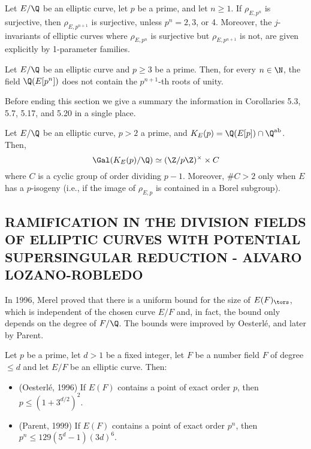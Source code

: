 \begin{thm} %
Let $E/\Q$ be an elliptic curve, let $p$ be a prime, and let $n \geq 1$. If $\rho_{E,p^n}$ is surjective, then $\rho_{E,p^{n+1}}$ is surjective, unless $p^n= 2,3$, or 4. Moreover, the $j$-invariants of elliptic curves where $\rho_{E,p^n}$ is surjective but $\rho_{E,p^{n+1}}$ is not, are given explicitly by 1-parameter families. 
\end{thm}


\begin{prop} %
Let $E/\Q$ be an elliptic curve and $p \geq 3$ be a prime. Then, for every $n \in \N$, the field $\Q(E[p^n])$ does not contain the $p^{n+1}$-th roots of unity. 
\end{prop}


Before ending this section we give a summary the information in Corollaries 5.3, 5.7, 5.17, and 5.20 in a single place.


\begin{prop}
Let $E/\Q$ be an elliptic curve, $p > 2$ a prime, and $K_E(p)= \Q(E[p]) \cap \Q^{\text{ab}}$. Then,
	\[
	\Gal(K_E(p)/\Q) \simeq (\Z/p\Z)^\times \times C
	\]
where $C$ is a cyclic group of order dividing $p - 1$. Moreover, $\#C > 2$ only when $E$ has a $p$-isogeny (i.e., if the image of $\rho_{E,p}$ is contained in a Borel subgroup). 
\end{prop}




\subsection{RAMIFICATION IN THE DIVISION FIELDS OF ELLIPTIC CURVES WITH POTENTIAL SUPERSINGULAR REDUCTION - ALVARO LOZANO-ROBLEDO}

In 1996, Merel proved that there is a uniform bound for the size of $E(F)_\tors$, which is independent of the chosen curve $E/F$ and, in fact, the bound only depends on the degree of $F/\Q$. The bounds were improved by Oesterl\'e, and later by Parent.


\begin{thm} %
Let $p$ be a prime, let $d > 1$ be a fixed integer, let $F$ be a number field $F$ of degree $\leq d$ and let $E/F$ be an elliptic curve. Then:
	\begin{itemize}
	\item (Oesterl\'e, 1996) If $E(F)$ contains a point of exact order $p$, then $p \leq (1 + 3^{d/2})^2$. 
	\item (Parent, 1999) If $E(F)$ contains a point of exact order $p^n$, then $p^n \leq 129 (5^d - 1)(3d)^6$. 
	\end{itemize}
\end{thm}


